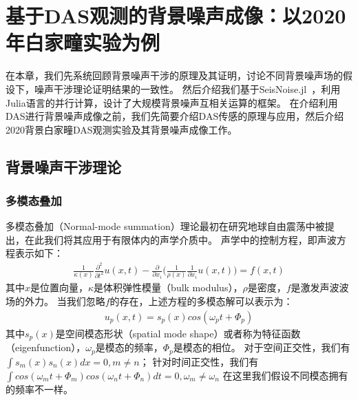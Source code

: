
\chapter{基于DAS观测的背景噪声成像：以2020年白家疃实验为例}

在本章，我们先系统回顾背景噪声干涉的原理及其证明，讨论不同背景噪声场的假设下，噪声干涉理论证明结果的一致性。
然后介绍我们基于SeisNoise.jl~\citep{clements2021seisnoise}，利用Julia语言的并行计算，设计了大规模背景噪声互相关运算的框架。
在介绍利用DAS进行背景噪声成像之前，我们先简要介绍DAS传感的原理与应用，然后介绍2020背景白家疃DAS观测实验及其背景噪声成像工作。

\section{背景噪声干涉理论}

\subsection{多模态叠加}
多模态叠加（Normal-mode summation）理论最初在研究地球自由震荡中被提出，在此我们将其应用于有限体内的声学介质中。
声学中的控制方程，即声波方程表示如下：
\begin{align}
    \frac{1}{\kappa (x)} \frac{\partial^2}{\partial t^2} u(x,t) 
    - 
    \frac{\partial}{\partial x_i} \bigl( \frac{1}{\rho(x)} \frac{1}{\partial x_i }  u(x,t)     \bigl)
    =
    f(x,t)
    \label{equ:ac-wave}
\end{align}
其中$x$是位置向量，$\kappa$是体积弹性模量（bulk modulus），$\rho$是密度，$f$是激发声波波场的外力。
当我们忽略$f$的存在，上述方程的多模态解可以表示为：
\begin{align}
    u_p(x,t) = s_p(x) cos(\omega_p t + \varPhi_p)
    \label{equ:ac-nm}
\end{align}
其中$s_p(x)$是空间模态形状（spatial mode shape）或者称为特征函数（eigenfunction），$\omega_p$是模态的频率，$\varPhi_p$是模态的相位。
对于空间正交性，我们有$\int s_m(x)s_n(x)dx = 0, m\neq n$；
针对时间正交性，我们有$\int cos(\omega_m t + \varPhi_m ) cos(\omega_n t + \varPhi_n ) dt = 0, \omega_m \neq  \omega_n   $
在这里我们假设不同模态拥有的频率不一样。

